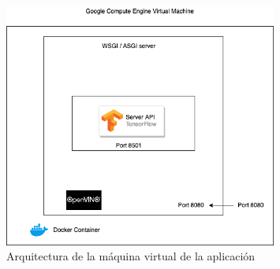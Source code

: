 \begin{figure}
    \centering
    \includegraphics[width=0.8\textwidth]{images/chapter4/host_architecture.png}
    \caption{Arquitectura de la máquina virtual de la aplicación}
    \label{fig:Arquitectura de la máquina virtual de la aplicación}
\end{figure}

